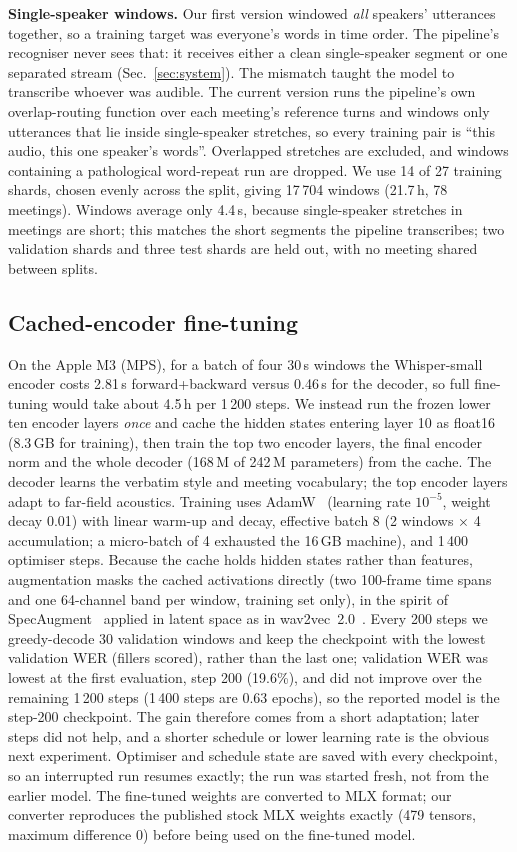 \documentclass[conference]{IEEEtran}
\begin{document}
\textbf{Single-speaker windows.} Our first version windowed \emph{all} speakers' utterances together, so a training target was everyone's words in time order. The pipeline's recogniser never sees that: it receives either a clean single-speaker segment or one separated stream (Sec.~\ref{sec:system}). The mismatch taught the model to transcribe whoever was audible. The current version runs the pipeline's own overlap-routing function over each meeting's reference turns and windows only utterances that lie inside single-speaker stretches, so every training pair is ``this audio, this one speaker's words''. Overlapped stretches are excluded, and windows containing a pathological word-repeat run are dropped. We use 14 of 27 training shards, chosen evenly across the split, giving 17\,704 windows (21.7\,h, 78 meetings). Windows average only 4.4\,s, because single-speaker stretches in meetings are short; this matches the short segments the pipeline transcribes; two validation shards and three test shards are held out, with no meeting shared between splits.

\subsection{Cached-encoder fine-tuning}
On the Apple M3 (MPS), for a batch of four 30\,s windows the Whisper-small encoder costs 2.81\,s forward+backward versus 0.46\,s for the decoder, so full fine-tuning would take about 4.5\,h per 1\,200 steps. We instead run the frozen lower ten encoder layers \emph{once} and cache the hidden states entering layer 10 as float16 (8.3\,GB for training), then train the top two encoder layers, the final encoder norm and the whole decoder (168\,M of 242\,M parameters) from the cache. The decoder learns the verbatim style and meeting vocabulary; the top encoder layers adapt to far-field acoustics. Training uses AdamW~\cite{loshchilov2019adamw} (learning rate $10^{-5}$, weight decay 0.01) with linear warm-up and decay, effective batch 8 (2 windows $\times$ 4 accumulation; a micro-batch of 4 exhausted the 16\,GB machine), and 1\,400 optimiser steps. Because the cache holds hidden states rather than features, augmentation masks the cached activations directly (two 100-frame time spans and one 64-channel band per window, training set only), in the spirit of SpecAugment~\cite{park2019specaugment} applied in latent space as in wav2vec~2.0~\cite{baevski2020wav2vec2}. Every 200 steps we greedy-decode 30 validation windows and keep the checkpoint with the lowest validation WER (fillers scored), rather than the last one; validation WER was lowest at the first evaluation, step 200 (19.6\%), and did not improve over the remaining 1\,200 steps (1\,400 steps are 0.63 epochs), so the reported model is the step-200 checkpoint. The gain therefore comes from a short adaptation; later steps did not help, and a shorter schedule or lower learning rate is the obvious next experiment. Optimiser and schedule state are saved with every checkpoint, so an interrupted run resumes exactly; the run was started fresh, not from the earlier model. The fine-tuned weights are converted to MLX format; our converter reproduces the published stock MLX weights exactly (479 tensors, maximum difference 0) before being used on the fine-tuned model.
\end{document}
